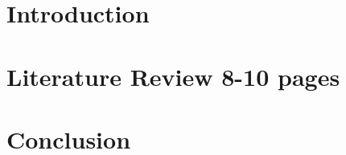 



\newpage
\tableofcontents

\newpage
\section{Introduction} \label{sec:introduction}


\newpage
\section{Literature Review 8-10 pages} \label{sec:literature-review}


\newpage
\section{Conclusion} \label{sec:conclusion}


\newpage



\newpage

